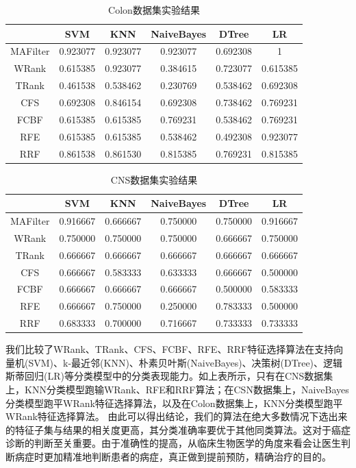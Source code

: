 \documentclass{njubachelor}
\begin{document}
\begin{table}        
\centering
\caption{Colon数据集实验结果}
\begin{tabular}{cccccc}
\hline
  & SVM & KNN & NaiveBayes & DTree & LR\\
\hline
MAFilter&0.923077&	0.923077&	0.923077&	0.692308&	1\\
WRank&	0.615385&	0.923077&	0.384615&	0.723077&	0.615385\\
TRank&	0.461538&	0.538462&	0.230769&	0.538462&	0.692308\\
CFS&	0.692308&	0.846154&	0.692308&	0.738462&	0.769231\\
FCBF&	0.615385&	0.615385&	0.769231&	0.538462&	0.769231\\
RFE&	0.615385&	0.615385&	0.538462&	0.492308&	0.923077\\
RRF&	0.861538&	0.861530&	0.815385&	0.769231&	0.815385\\
\hline
\end{tabular}
\end{table}

\begin{table}        
\centering
\caption{CNS数据集实验结果}
\begin{tabular}{cccccc}
\hline
  & SVM & KNN & NaiveBayes & DTree & LR\\
\hline
MAFilter&0.916667&	0.666667&	0.750000&	0.750000&	0.916667\\
WRank&	0.750000&	0.750000&	0.750000&	0.666667&	0.750000\\
TRank&	0.666667&	0.666667&	0.666667&	0.666667&	0.666667\\
CFS&	0.666667&	0.583333&	0.633333&	0.666667&	0.500000\\
FCBF&	0.666667&	0.666667&	0.666667&	0.500000&	0.583333\\
RFE&	0.666667&	0.750000&	0.250000&	0.783333&	0.500000\\
RRF&	0.683333&	0.700000&	0.716667&	0.733333&	0.733333\\  
\hline
\end{tabular}
\end{table}

我们比较了WRank、TRank、CFS、FCBF、RFE、RRF特征选择算法在支持向量机(SVM)、k-最近邻(KNN)、朴素贝叶斯(NaiveBayes)、决策树(DTree)、逻辑斯蒂回归(LR)等分类模型中的分类表现能力。如上表所示，只有在CNS数据集上，KNN分类模型跑输WRank、RFE和RRF算法；在CSN数据集上，NaiveBayes分类模型跑平WRank特征选择算法，以及在Colon数据集上，KNN分类模型跑平WRank特征选择算法。
由此可以得出结论，我们的算法在绝大多数情况下选出来的特征子集与结果的相关度更高，其分类准确率要优于其他同类算法。这对于癌症诊断的判断至关重要。由于准确性的提高，从临床生物医学的角度来看会让医生判断病症时更加精准地判断患者的病症，真正做到提前预防，精确治疗的目的。
\end{document}
